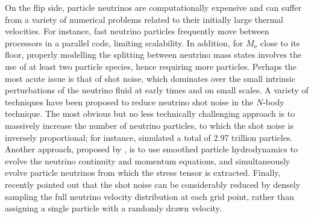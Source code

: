 \documentclass[useAMS, usenatbib]{mnras}
\begin{document}
On the flip side, particle neutrinos are computationally expensive and can suffer from a variety of numerical problems related to their initially large thermal velocities. For instance, fast neutrino particles frequently move between processors in a parallel code, limiting scalability. In addition, for $M_\nu$ close to its floor, properly modelling the splitting between neutrino mass states involves the use of at least two particle species, hence requiring more particles. Perhaps the most acute issue is that of shot noise, which dominates over the small intrinsic perturbations of the neutrino fluid at early times and on small scales. %
A variety of techniques have been proposed to reduce neutrino shot noise in the $N$-body technique. The most obvious but no less technically challenging approach is to massively increase the number of neutrino particles, to which the shot noise is inversely proportional; for instance, \cite{Emberson_17} simulated a total of 2.97 trillion particles. Another approach, proposed by \cite{Banerjee_2016}, is to use smoothed particle hydrodynamics to evolve the neutrino continuity and momentum equations, and simultaneously evolve particle neutrinos from which the stress tensor is extracted. Finally, \cite{Banerjee_2018} recently pointed out that the shot noise can be considerably reduced by densely sampling the full neutrino velocity distribution at each grid point, rather than assigning a single particle with a randomly drawn velocity.

\end{document}

